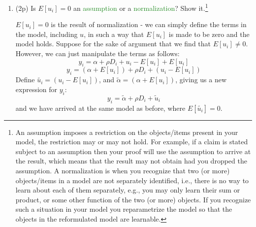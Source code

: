 \documentclass{article}
\begin{document}
\begin{enumerate}[label=\textbf{Q\arabic{enumi}}.,ref=Q\arabic{enumi}, wide=0pt, itemsep=1em, topsep=5pt]
\begin{enumerate}
\begin{solution}
{        }
        \end{solution}

        \newpage
        \item (2p) Is $E\left[ u _{i}\right] =0$ an \textcolor{ForestGreen}{assumption} or a \textcolor{ForestGreen}{normalization}? Show it.\footnote{An assumption imposes a restriction on the objects/items present in your model, the restriction may or may not hold. For example, if a claim is stated subject to an assumption then your proof will use the assumption to arrive at the result, which means that the result may not obtain had you dropped the assumption. A normalization is when you recognize that two (or more) objects/items in a model are not separately identified, i.e., there is no way to learn about each of them separately, e.g., you may only learn their sum or product, or some other function of the two (or more) objects. If you recognize such a situation in your model you reparametrize the model so that the objects in the reformulated model are learnable.}
        \begin{solution}
            {
                $E[u_i] = 0$ is the result of normalization - we can simply define the terms in the model, including $u$, in such a way that $E[u_i]$ is made to be zero and the model holds. Suppose for the sake of argument that we find that $E[u_i] \neq 0$. However, we can just manipulate the terms as follows:
                \[ y_i = \alpha + \rho D_i + u_i - E[u_i]  + E[u_i]\]
                \[ y_i = (\alpha + E[u_i]) + \rho D_i + \left( u_i - E[u_i] \right) \]
                Define $\tilde{u_i} = \left( u_i - E[u_i] \right)$, and $\tilde{\alpha} = \left( \alpha + E[u_i] \right)$, giving us a new expression for $y_i$: 
                \[ y_i = \tilde{\alpha} + \rho D_i + \tilde{u}_i \]
                and we have arrived at the same model as before, where $E[\tilde{u_i}] = 0$.

}
\end{solution}
\end{enumerate}
\end{enumerate}
\end{document}
